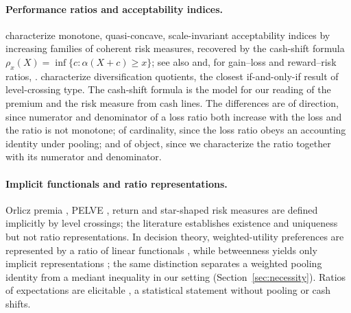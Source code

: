 \paragraph{Performance ratios and acceptability indices.}
\citet{chernymadan2009} characterize monotone, quasi-concave, scale-invariant acceptability indices by increasing
families of coherent risk measures, recovered by the cash-shift formula $\rho_x(X)=\inf\{c:\alpha(X+c)\ge x\}$;
see also \citet{bcz2014,bbn2014,drapeaukupper2013} and, for gain--loss and reward--risk ratios,
\citet{bernardoledoit2000,biaginipinar2013,ck2013}. \citet{hlw2025} characterize diversification quotients, the
closest if-and-only-if result of level-crossing type. The cash-shift formula is the model for our reading of the
premium and the risk measure from cash lines. The differences are of direction, since numerator and denominator of a
loss ratio both increase with the loss and the ratio is not monotone; of cardinality, since the loss ratio obeys an
accounting identity under pooling; and of object, since we characterize the ratio together with its numerator and
denominator.

\paragraph{Implicit functionals and ratio representations.}
Orlicz premia \citep{hg1982,brg2008}, PELVE \citep{liwang2023,fiorirg2023}, return and star-shaped risk measures
\citep{blrg2018,castagnoli2022} are defined implicitly by level crossings; the literature establishes existence and
uniqueness but not ratio representations. In decision theory, weighted-utility preferences are represented by a
ratio of linear functionals \citep{chew1983}, while betweenness yields only implicit representations
\citep{dekel1986,fishburn1983}; the same distinction separates a weighted pooling identity from a mediant inequality
in our setting (Section~\ref{sec:necessity}). Ratios of expectations are elicitable \citep{gneiting2011}, a statistical
statement without pooling or cash shifts.
